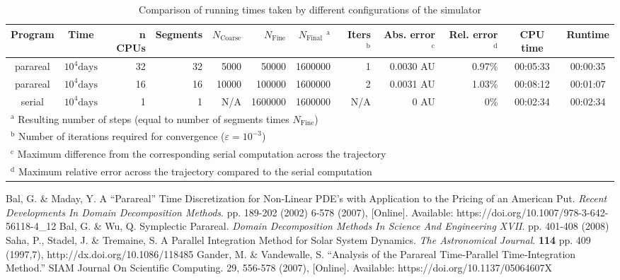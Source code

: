 \documentclass[conference]{IEEEtran}
\begin{document}
\begin{table*}[htbp]
\caption{Comparison of running times taken by different configurations of the simulator}
\begin{center}
\begin{tabular}{ccrrrrrrrrcc}
\toprule
Program & Time &  n CPUs & Segments & $N_\text{Coarse}$ & $N_{\text{Fine}}$ & $N_{\text{Final}}$ $^{\mathrm{a}}$ & Iters $^{\mathrm{b}}$ & Abs. error $^{\mathrm{c}}$ & Rel. error $^{\mathrm{d}}$ & CPU time & Runtime \\
\midrule
parareal & $10^4\text{days}$ & 32 & 32 &  5000 &  50000 & 1600000 & 1 & 0.0030 AU & 0.97\% & 00:05:33 & 00:00:35 \\
parareal & $10^4\text{days}$ & 16 & 16 & 10000 & 100000 & 1600000 & 2 & 0.0031 AU & 1.03\% & 00:08:12 & 00:01:07 \\
serial & $10^4\text{days}$ & 1 & 1 & N/A & 1600000 & 1600000 & N/A & 0 AU & 0\% & 00:02:34 & 00:02:34 \\
\bottomrule
\multicolumn{11}{l}{$^{\mathrm{a}}$ Resulting number of steps (equal to number of segments times $N_\text{Fine}$)} \\
\multicolumn{11}{l}{$^{\mathrm{b}}$ Number of iterations required for convergence ($\varepsilon = 10^{-3}$)} \\
\multicolumn{11}{l}{$^{\mathrm{c}}$ Maximum difference from the corresponding serial computation across the trajectory} \\
\multicolumn{11}{l}{$^{\mathrm{d}}$ Maximum relative error across the trajectory compared to the serial computation}
\end{tabular}
\label{runtimes}
\end{center}
\end{table*}

\begin{thebibliography}{00}
Bal, G. \& Maday, Y. A “Parareal” Time Discretization for Non-Linear PDE's with Application to the Pricing of an American Put. {\em Recent Developments In Domain Decomposition Methods}. pp. 189-202 (2002)
6-578 (2007), [Online]. Available: https://doi.org/10.1007/978-3-642-56118-4\_12
Bal, G. \& Wu, Q. Symplectic Parareal. {\em Domain Decomposition Methods In Science And Engineering XVII}. pp. 401-408 (2008)
Saha, P., Stadel, J. \& Tremaine, S. A Parallel Integration Method for Solar System Dynamics. {\em The Astronomical Journal}. \textbf{114} pp. 409 (1997,7), http://dx.doi.org/10.1086/118485
Gander, M. \& Vandewalle, S. ``Analysis of the Parareal Time‐Parallel Time‐Integration Method.'' SIAM Journal On Scientific Computing. 29, 556-578 (2007), [Online]. Available: https://doi.org/10.1137/05064607X
\end{thebibliography}
\end{document}
